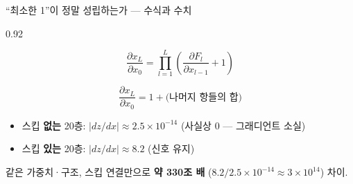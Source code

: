 \begin{frame}{``최소한 1''이 정말 성립하는가 --- 수식과 수치}
\begin{center}\begin{varwidth}{0.92\textwidth}
  
  \[ \frac{\partial x_L}{\partial x_0}
     = \prod_{l=1}^{L} \left( \frac{\partial F_l}{\partial x_{l-1}}
        + 1 \right) \]
  
  \[ \frac{\partial x_L}{\partial x_0}
     = 1 + \text{(나머지 항들의 합)} \]
  
  \begin{itemize}
    \item 스킵 \textbf{없는} 20층: $|dz/dx| \approx 2.5\times10^{-14}$
      (사실상 0 --- 그래디언트 소실)
    \item 스킵 \textbf{있는} 20층: $|dz/dx| \approx 8.2$
      (신호 유지)
  \end{itemize}
  같은 가중치·구조, 스킵 연결만으로 \textbf{약 330조 배}
  ($8.2 / 2.5\times10^{-14} \approx 3\times10^{14}$) 차이.
\end{varwidth}\end{center}
\end{frame}
